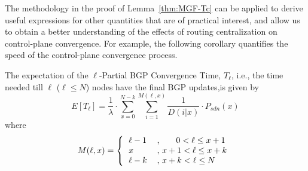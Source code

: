 The methodology in the proof of Lemma~\ref{thm:MGF-Tc} can be applied to derive useful expressions for other quantities that are of practical interest, and allow us to obtain a better understanding of the effects of routing centralization on control-plane convergence. For example, the following corollary quantifies the speed of the control-plane convergence process.%




\begin{corollary}\label{thm:l-partial-Tc}
The expectation of the $\ell$-Partial BGP Convergence Time, $T_{\ell}$, i.e., the time needed till $\ell$ ($\ell\leq N$) nodes have the final BGP updates,is given by
\begin{equation}
E[T_{\ell}] = \frac{1}{\lambda}\cdot \sum_{x=0}^{N-k} \sum_{i=1}^{M(\ell,x)}\frac{1}{D(i|x)}\cdot P_{sdn}(x)
\end{equation}
where
\begin{equation}
M(\ell,x) = \left\{
\begin{tabular}{ll}
$\ell-1$		&		, $~~~~~0<\ell\leq x+1$	\\
$x$			&		, $x+1<\ell\leq x+k$	\\
$\ell-k$		&		, $x+k<\ell\leq N$	\\
\end{tabular}
\right.
\end{equation}
\end{corollary}


%






